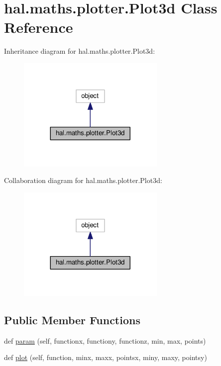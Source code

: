 \hypertarget{classhal_1_1maths_1_1plotter_1_1_plot3d}{}\section{hal.\+maths.\+plotter.\+Plot3d Class Reference}
\label{classhal_1_1maths_1_1plotter_1_1_plot3d}


Inheritance diagram for hal.\+maths.\+plotter.\+Plot3d\+:
\nopagebreak
\begin{figure}[H]
\begin{center}
\leavevmode
\includegraphics[width=200pt]{classhal_1_1maths_1_1plotter_1_1_plot3d__inherit__graph}
\end{center}
\end{figure}


Collaboration diagram for hal.\+maths.\+plotter.\+Plot3d\+:
\nopagebreak
\begin{figure}[H]
\begin{center}
\leavevmode
\includegraphics[width=200pt]{classhal_1_1maths_1_1plotter_1_1_plot3d__coll__graph}
\end{center}
\end{figure}
\subsection*{Public Member Functions}
\begin{DoxyCompactItemize}
\item 
def \hyperlink{classhal_1_1maths_1_1plotter_1_1_plot3d_ad17823fc8ceb91fa2c602c45f8eae70e}{param} (self, functionx, functiony, functionz, min, max, points)
\item 
def \hyperlink{classhal_1_1maths_1_1plotter_1_1_plot3d_a1e249de9ab5dac1acc94f82bada6deb0}{plot} (self, function, minx, maxx, pointsx, miny, maxy, pointsy)
\end{DoxyCompactItemize}
